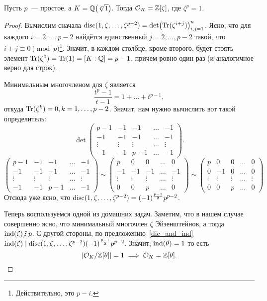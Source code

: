 		\begin{theorem} 
			Пусть $p$~--- простое, а $K = \Q\lr*{\sqrt[p]{1}}$. Тогда $\mathcal{O}_{K} = \mathbb{Z}[\zeta]$, где $\zeta^p = 1$.
		\end{theorem}
		\begin{proof}
			Вычислим сначала $\disc(1, \zeta, \ldots, \zeta^{p - 2}) = \det\lr*{\Tr(\zeta^{i + j})}_{i, j = 1}^{n}$. Ясно, что для каждого $i = 2, \ldots, p - 2$ найдётся единственный $j = 2, \ldots, p - 2$ такой, что $i + j \equiv 0 \pmod{p}$\footnote{Действительно, это $p - i$.}. Значит, в каждом столбце, кроме второго, будет стоять элемент $\operatorname{Tr}(\zeta^0) = \operatorname{Tr}(1) = [K : \mathbb{Q}] = p - 1$, причем ровно один раз (и аналогичное верно для строк).

			Минимальным многочленом для $\zeta$ является 
			\[
			  	\frac{t^p - 1}{t - 1} = 1 + \ldots + t^{p - 1},
			  \]  
			  откуда $\operatorname{Tr}(\zeta^{k}) = 0, k = 1, \ldots, p - 2$. Значит, нам нужно вычислить вот такой определитель: 
			  \[
			  	\det\begin{pmatrix} p - 1 & -1 & -1 & \ldots & - 1 \\ 
			  						-1    & -1 & -1 & \ldots &  -1 \\ 
			  						\vdots & \vdots & \vdots & \ldots & \vdots \\
			  						-1 & -1 & p - 1 & \ldots & -1  \end{pmatrix}.
			  \]
			\[
			  	\begin{pmatrix} p - 1 & -1 & -1 & \ldots & - 1 \\ 
			  						-1    & -1 & -1 & \ldots &  -1 \\ 
			  						\vdots & \vdots & \vdots & \ldots & \vdots \\
			  						-1 & -1 & p - 1 & \ldots & -1  \end{pmatrix} \sim \begin{pmatrix} p  & 0 & 0 & \ldots & 0 \\ 
			  						-1    & -1 & -1 & \ldots &  -1 \\ 
			  						\vdots & \vdots & \vdots & \ldots & \vdots \\
			  						0 & 0 & p  & \ldots & 0  \end{pmatrix}	\sim \begin{pmatrix} p  & 0 & 0 & \ldots & 0 \\ 
			  						0    & -1 & 0 & \ldots &  0 \\ 
			  						\vdots & \vdots & \vdots & \ldots & \vdots \\
			  						0 & 0 & p  & \ldots & 0  \end{pmatrix}
			 \]  
			 Отсюда уже ясно, что $\operatorname{disc}(1, \zeta, \ldots, \zeta^{p - 2}) = (-1)^{\frac{p - 1}{2}} p^{p - 2}$. 

			 Теперь воспользуемся одной из домашних задач. Заметим, что в нашем случае совершенно ясно, что минимальный многочлен $\zeta$ Эйзенштейнов, а тогда $\ind(\zeta) \notdivby p$. С другой стороны, по предложению~\ref{dic_and_ind} $\operatorname{ind}(\zeta) \mid \operatorname{disc}(1, \zeta, \ldots, \zeta^{p - 2}) (-1)^{\frac{p - 1}{2}} p^{p - 2}$. Значит, $\operatorname{ind}(\theta) = 1$ то есть 
			 \[
			 	|\mathcal{O}_{K}/\mathbb{Z}[\theta]| = 1 \implies \mathcal{O}_{K} = \mathbb{Z}[\theta].
			 \]
		\end{proof}	 